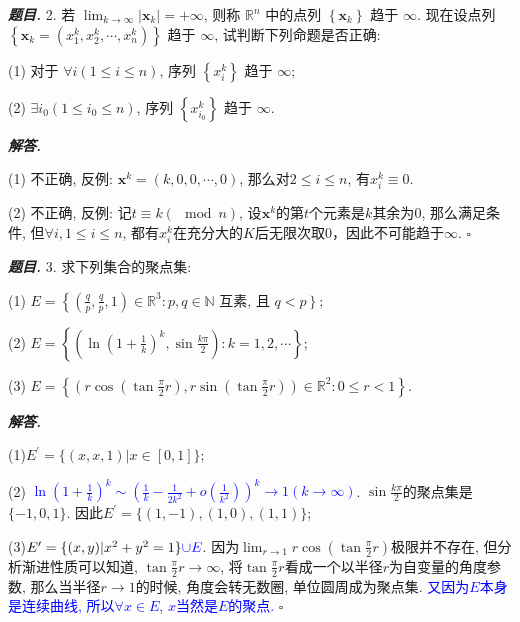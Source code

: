 \documentclass[10pt, a4paper, oneside]{ctexart}
\newenvironment{problem}{\begin{framed}\par\noindent\textbf{\textit{题目. }}}{\end{framed}\par}
\newenvironment{solution}{%
  \par\noindent\textbf{\textit{解答. }}\ignorespaces
}{%
  \hfill\ensuremath{\square}\par %
}
\begin{document}
\begin{problem}
2. 若 $\lim _{k \rightarrow \infty}\left|\boldsymbol{x}_k\right|=+\infty$, 则称 $\mathbb{R}^n$ 中的点列 $\left\{\boldsymbol{x}_k\right\}$ 趋于 $\infty$. 现在设点列 $\left\{\boldsymbol{x}_k=\left(x_1^k, x_2^k, \cdots, x_n^k\right)\right\}$ 趋于 $\infty$, 试判断下列命题是否正确:

(1) 对于 $\forall i(1 \leqslant i \leqslant n)$, 序列 $\left\{x_i^k\right\}$ 趋于 $\infty$;

(2) $\exists i_0\left(1 \leqslant i_0 \leqslant n\right)$, 序列 $\left\{x_{i_0}^k\right\}$ 趋于 $\infty$.
\end{problem}
\begin{solution}
    (1) 不正确, 反例: $\bm{x}^k=(k,0,0,\cdots,0)$, 那么对$2\leq i\leq n$, 有$x_i^k\equiv 0$.
    
    (2) 不正确, 反例: 记$t\equiv k (\mod n)$, 设$\bm{x}^k$的第$t$个元素是$k$其余为$0$, 那么满足条件, 但$\forall i, 1\leq i \leq n$, 都有$x_{i}^k$在充分大的$K$后无限次取$0$，因此不可能趋于$\infty$.
\end{solution}

\begin{problem}
3. 求下列集合的聚点集:

(1) $E=\left\{\left(\frac{q}{p}, \frac{q}{p}, 1\right) \in \mathbb{R}^3: p, q \in \mathbb{N}\right.$ 互素, 且 $\left.q<p\right\}$;

(2) $E=\left\{\left(\ln \left(1+\frac{1}{k}\right)^k, \sin \frac{k \pi}{2}\right): k=1,2, \cdots\right\}$;

(3) $E=\left\{\left(r \cos \left(\tan \frac{\pi}{2} r\right), r \sin \left(\tan \frac{\pi}{2} r\right)\right) \in \mathbb{R}^2: 0 \leqslant r<1\right\}$.
\end{problem}
\begin{solution}
    (1)$E^{\prime}=\{(x,x,1)|x\in[0,1]\}$;

    (2) \textcolor{blue}{$\ln(1+\frac{1}{k})^k \sim (\frac{1}{k}-\frac{1}{2k^2}+o(\frac{1}{k^2}))^k \to 1(k\to \infty)$}. $\sin \frac{k\pi}{2}$的聚点集是$\{-1,0,1\}$. 因此$E^{\prime}=\{(1,-1),(1,0),(1,1)\}$;

    (3)\textcolor{red}{$E^{\prime}=\{(x,y)|x^2+y^2=1\}\textcolor{blue}{\cup E}$}. 因为$\lim_{r\to 1}r\cos(\tan\frac{\pi}{2}r)$极限并不存在, 但分析渐进性质可以知道, $\tan\frac{\pi}{2}r\to \infty$, 将$\tan\frac{\pi}{2}r$看成一个以半径$r$为自变量的角度参数, 那么当半径$r\to 1$的时候, 角度会转无数圈, 单位圆周成为聚点集. \textcolor{blue}{又因为$E$本身是连续曲线, 所以$\forall x\in E$, $x$当然是$E$的聚点.}
\end{solution}
\end{document}

